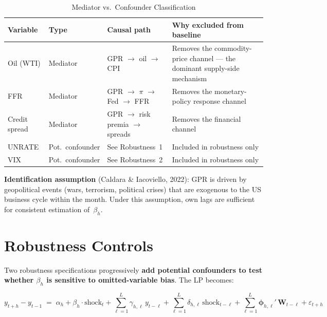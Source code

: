 \documentclass[11pt,a4paper]{article}
\begin{document}
\begin{table}[H]
\centering
\caption{Mediator vs.\ Confounder Classification}
\label{tab:mediator}
\small
\begin{tabular}{@{}l l l p{5.5cm}@{}}
\toprule
\textbf{Variable} & \textbf{Type} & \textbf{Causal path} & \textbf{Why excluded from baseline} \\
\midrule
Oil (WTI)     & Mediator & GPR $\to$ oil $\to$ CPI          & Removes the commodity-price channel --- the dominant supply-side mechanism \\
FFR           & Mediator & GPR $\to$ $\pi$ $\to$ Fed $\to$ FFR & Removes the monetary-policy response channel \\
Credit spread & Mediator & GPR $\to$ risk premia $\to$ spreads & Removes the financial channel \\
\midrule
UNRATE        & Pot.\ confounder & See Robustness~1 & Included in robustness only \\
VIX           & Pot.\ confounder & See Robustness~2 & Included in robustness only \\
\bottomrule
\end{tabular}
\end{table}

\noindent\textbf{Identification assumption} (Caldara \& Iacoviello, 2022): GPR is driven by geopolitical events (wars, terrorism, political crises) that are exogenous to the US business cycle within the month. Under this assumption, own lags are sufficient for consistent estimation of~$\beta_h$.

\section{Robustness Controls}

Two robustness specifications progressively \textbf{add potential confounders to test whether $\beta_h$ is sensitive to omitted-variable bias}. The LP becomes:

\begin{equation}
y_{t+h} - y_{t-1}
\;=\;
\alpha_h + \beta_h \cdot \text{shock}_t
+ \sum_{\ell=1}^{L} \gamma_{h,\ell}\, y_{t-\ell}
+ \sum_{\ell=1}^{L} \delta_{h,\ell}\, \text{shock}_{t-\ell}
+ \sum_{\ell=1}^{L} \boldsymbol{\phi}_{h,\ell}'\, \mathbf{W}_{t-\ell}
+ \varepsilon_{t+h}
\label{eq:lp_robust}
\end{equation}
\end{document}
